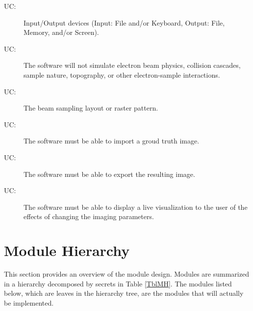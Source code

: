 \documentclass[12pt, titlepage]{article}
\newcounter{ucnum}
\newcommand{\uctheucnum}{UC\theucnum}
\begin{document}
\begin{description}
  \item[ \uctheucnum \label{UC_IO}:] Input/Output devices
    (Input: File and/or Keyboard, Output: File, Memory, and/or Screen).
  \item[ \uctheucnum \label{UC_physics}:] The software will not
    simulate electron beam physics, collision cascades, sample nature, topography, 
    or other electron-sample interactions.
  \item[ \uctheucnum \label{UC_layout}:] The beam sampling
    layout or raster pattern.
  \item[ \uctheucnum \label{UC_import}:] The software must
    be able to import a groud truth image.
  \item[ \uctheucnum \label{UC_export}:] The software must
    be able to export the resulting image.
  \item[ \uctheucnum \label{UC_visualize}:] The software must be able
    to display a live visualization to the user of the effects of changing the imaging parameters.
\end{description}

\section{Module Hierarchy} \label{SecMH}

This section provides an overview of the module design. Modules are summarized
in a hierarchy decomposed by secrets in Table \ref{TblMH}. The modules listed
below, which are leaves in the hierarchy tree, are the modules that will
actually be implemented.
\end{document}

